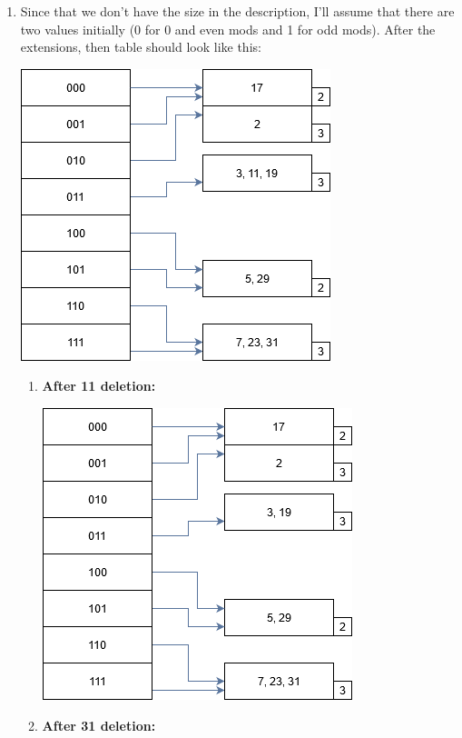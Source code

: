 \documentclass[paper=8.27in:11.69in, 14pt, DIV=calc]{scrartcl}
\begin{document}
\begin{enumerate}[label=\alph*.]

\item Since that we don't have the size in the description, I'll assume that there are two values initially (0 for 0 and even mods and 1 for odd mods). After the extensions, then table should look like this:

\includegraphics[]{ExHashTable.png}

\begin{enumerate}[label=b.\arabic*.]

\item \textbf{After 11 deletion:}

\includegraphics[]{ExHashTableAfter11Deletion.png}

\item \textbf{After 31 deletion:}


\end{enumerate}
\end{enumerate}
\end{document}
